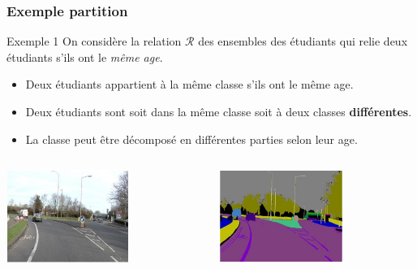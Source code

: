 \documentclass[usenames,dvipsnames]{beamer}
\begin{document}
\begin{frame}[<+->]
  \frametitle{Exemple partition}
 \begin{block}{Exemple 1}
   \small
   On considère la relation $\mathcal{R}$ des ensembles des étudiants qui relie
   deux étudiants s'ils ont le \emph{même age}.\\[4pt]

   \begin{itemize}
     \scriptsize
     \item Deux étudiants appartient à la même classe s'ils ont le même
       age.\\[4pt]
     \item Deux étudiants sont soit dans la même classe soit à deux classes
       \alert{\textbf{différentes}}.\\[4pt]
     \item La classe peut être décomposé en différentes parties selon leur age.
   \end{itemize}
 \end{block} 
 \pause
 \vspace*{1cm}
 \begin{columns}
   \begin{column}{0.5\textwidth}
     \centering
     \includegraphics[width=4cm, height=3cm]{./segmentation_01.jpg}
   \end{column}
   \begin{column}{0.5\textwidth}
     \centering
     \includegraphics[width=4cm, height=3cm]{./segmentation_02.jpg}
   \end{column}
 \end{columns}
\end{frame}
 
\end{document}
